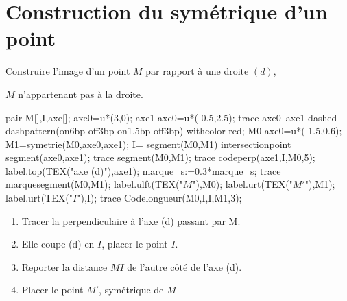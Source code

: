 \section{Construction du symétrique d'un point}
\begin{methode*1}    
    \exercice
    Construire l'image d'un point $M$ par rapport à une droite $(d)$,
    
    $M$ n'appartenant pas à la droite.
    \correction
    \begin{minipage}{0.35\linewidth}
        \begin{center}
            \begin{Geometrie}
                pair M[],I,axe[];
                axe0=u*(3,0);
                axe1-axe0=u*(-0.5,2.5);                
                trace axe0--axe1 dashed dashpattern(on6bp off3bp on1.5bp off3bp) withcolor red;
                M0-axe0=u*(-1.5,0.6);
                M1=symetrie(M0,axe0,axe1);
                I= segment(M0,M1) intersectionpoint segment(axe0,axe1);
                trace segment(M0,M1);                
                trace codeperp(axe1,I,M0,5);
                label.top(TEX("axe (d)"),axe1);
                marque_s:=0.3*marque_s;
                trace marquesegment(M0,M1);
                label.ulft(TEX("$M$"),M0);
                label.urt(TEX("$M'$"),M1);
                label.urt(TEX("$I$"),I);
                trace Codelongueur(M0,I,I,M1,3);
            \end{Geometrie}
        \end{center}
    \end{minipage}
    \begin{minipage}{0.65\linewidth}
        \begin{enumerate}
            \item Tracer la perpendiculaire à l'axe (d) passant par M.
            \item Elle coupe (d) en $I$, placer le point $I$.
            \item Reporter la distance $MI$ de l'autre côté de l'axe (d).
            \item Placer le point $M'$, symétrique de $M$
        \end{enumerate}
    \end{minipage}
    \begin{myBox}{}
        \begin{minipage}{\linewidth}
        
            \creditInstrumentPoche
        \end{minipage}
    \end{myBox}
\end{methode*1}

